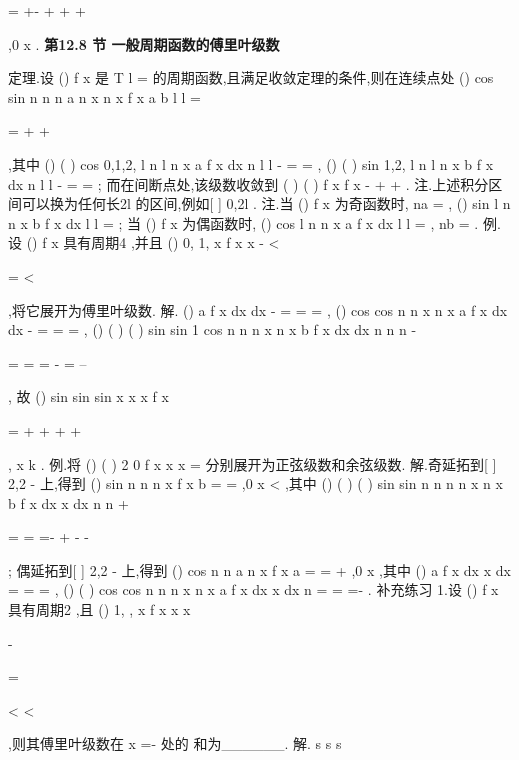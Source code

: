 =
+-
+
+
+




\Lambda ,0
x
\pi 
\le 
\le 
. 
\vspace{6pt}
{\large \bfseries \textcolor{lyred}{第12.8 节 一般周期函数的傅里叶级数}}

\textcolor{lyred}{定理}.设
()
f x 是
T
l
=
的周期函数,且满足收敛定理的条件,则在连续点处 
()
cos
sin
n
n
n
a
n x
n x
f x
a
b
l
l
\pi 
\pi 
\infty 
=


=
+
+




\sum 
,其中 
()
(
)
cos
0,1,2,
l
n
l
n x
a
f x
dx n
l
l
\pi 
-
=
=
\int 
\Lambda ,
()
(
)
sin
1,2,
l
n
l
n x
b
f x
dx n
l
l
\pi 
-
=
=
\int 
\Lambda ; 
而在间断点处,该级数收敛到
(
)
(
)
f x
f x
-
+
+
. 
\textcolor{lyred}{注}.上述积分区间可以换为任何长2l 的区间,例如[
]
0,2l . 
\textcolor{lyred}{注}.当
()
f x 为奇函数时,
na =
,
()
sin
l
n
n x
b
f x
dx
l
l
\pi 
=\int 
; 
当
()
f x 为偶函数时,
()
cos
l
n
n x
a
f x
dx
l
l
\pi 
=\int 
,
nb =
. 
\textcolor{lyred}{例}.设
()
f x 具有周期4 ,并且
()
0,
1,
x
f x
x
-\le 
<

=
\le 
<

,将它展开为傅里叶级数. 
解.
()
a
f x dx
dx
-
=
=
=
\int 
\int 
,
()
cos
cos
n
n x
n x
a
f x
dx
dx
\pi 
\pi 
-
=
=
=
\int 
\int 
, 
()
(
)
(
)
sin
sin
1 cos
n
n
n x
n x
b
f x
dx
dx
n
n
n
\pi 
\pi 
\pi 
\pi 
\pi 
-


=
=
=
-
=
--


\int 
\int 
, 
故
()
sin
sin
sin
x
x
x
f x
\pi 
\pi 
\pi 
\pi 


=
+
+
+
+




\Lambda ,
x
k
\neq 
. 
\textcolor{lyred}{例}.将
()
(
)
2 0
f x
x
x
=
\le 
\le 
分别展开为正弦级数和余弦级数. 
解.奇延拓到[
]
2,2
-
上,得到
()
sin
n
n
n x
f
x
b
\pi 
\infty 
=
=\sum 
,0
x
\le 
<
,其中 
()
(
)
(
)
sin
sin
n
n
n
n x
n x
b
f x
dx
x
dx
n
n
\pi 
\pi 
\pi 
\pi 
+


=
=
=-
+
-
-


\int 
\int 
; 
偶延拓到[
]
2,2
-
上,得到
()
cos
n
n
a
n x
f x
a
\pi 
\infty 
=
=
+\sum 
,0
x
\le 
\le 
,其中 
()
a
f x dx
x dx
=
=
=
\int 
\int 
,
()
(
)
cos
cos
n
n
n x
n x
a
f x
dx
x
dx
n
\pi 
\pi 
\pi 
=
=
=-
\int 
\int 
. 
\textcolor{lyred}{补充练习 }
1.设
()
f x 具有周期2 ,且
()
1,
,
x
f x
x
x

-\le 
\le 

=

<
<

,则其傅里叶级数在
x =-
处的 
和为______.\textcolor{lyred}{ }
解.
s
s
s








